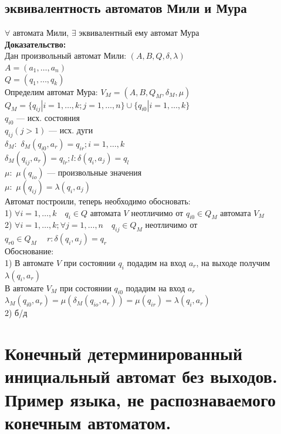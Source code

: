\documentclass[12pt]{article}
\begin{document}
\subsection{эквивалентность автоматов Мили и Мура}
	$\forall$ автомата Мили, $\exists$ эквивалентный ему автомат Мура\\
	\textbf{Доказательство:}\\
	Дан произвольный автомат Мили: $(A, B, Q, \delta, \lambda)$\\
	$A = (a_1, \dotsc, a_n)$\\
	$Q = (q_1, \dotsc, q_k)$\\
	Определим автомат Мура: $V_M = (A, B, Q_M, \delta_M, \mu)$\\
	$Q_M = \{q_{ij} | i = 1,\dotsc,k; j = 1, \dotsc, n\} \cup \{q_{i0} | i = 1,\dotsc,k\}$\\
	$q_{i0}$ — исх. состояния\\
	$q_{ij} (j > 1)$ — исх. дуги\\
	$\delta_M:$ $\delta_M(q_{i0}, a_r) = q_{ir}; i = 1,\dotsc,k$\\
				$\delta_M(q_{ij}, a_r) = q_{lr}; l: \delta(q_i,a_j) = q_l$\\
	$\mu:$ $\mu(q_{io})$ — произвольные значения\\
	$\mu:$ $\mu(q_{ij}) = \lambda(q_i, a_j)$\\
	Автомат построили, теперь необходимо обосновать:\\
	1) $\forall i = 1, \dotsc, k \quad q_i \in Q$ автомата $V$ неотличимо от $q_{i0} \in Q_M$ автомата $V_M$\\ 
	2) $\forall i = 1, \dotsc, k; \forall j = 1, \dotsc, n \quad q_{ij} \in Q_M$ неотличимо от $q_{r0} \in Q_M\ \quad r: \delta(q_i, a_j) = q_r$\\
	Обоснование:\\
	1) В автомате $V$ при состоянии $q_i$ подадим на вход $a_r$, на выходе получим $\lambda(q_i, a_r)$\\
	В автомате $V_M$ при состоянии $q_{i0}$ подадим на вход $a_r$\\
	$\lambda_M(q_{i0}, a_r) = \mu(\delta_M(q_{io}, a_r)) = \mu(q_{ir}) = \lambda(q_i, a_r)$\\
	2) б/д\\ 
	\qedsymbol

\section{Конечный детерминированный инициальный автомат без выходов. Пример языка, не распознаваемого конечным автоматом.}
\end{document}
